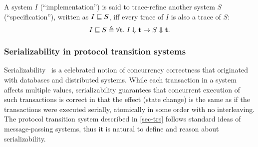 \begin{definition}
  A system $I$ (``implementation'') is said to trace-refine another system $S$
  (``specification''), written as $I \sqsubseteq S$, iff every trace of $I$ is
  also a trace of $S$:
  \begin{displaymath}
    I \sqsubseteq S \triangleq \forall \mathbf{t}.\; I \Downarrow \mathbf{t} \to S \Downarrow \mathbf{t}.
  \end{displaymath}
\end{definition}

\subsubsection{Serializability in protocol transition systems}

Serializability~\cite{sz1,sz2} is a celebrated notion of concurrency correctness that originated with databases and distributed systems.
While each transaction in a system affects multiple values, serializability guarantees that concurrent execution of such transactions is correct in that the effect (state change) is the same as if the transactions were executed serially, \ie{} atomically in some order with no interleaving.
The protocol transition system described in \autoref{sec-trs} follows standard ideas of message-passing systems, thus it is natural to define and reason about serializability.

